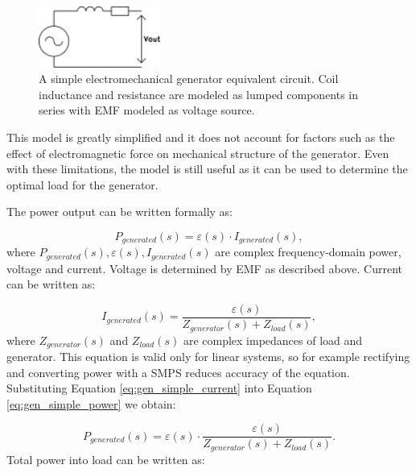 \begin{figure}[htb]
\begin{center}
\includegraphics[height=2cm]{images/own_dwg/gen_simple}
\end{center}
\caption{A simple electromechanical generator equivalent circuit. Coil inductance and resistance are modeled as lumped components in series with EMF modeled as voltage source.}
\label{gen_simple}
\end{figure}

This model is greatly simplified and it does not account for factors such as the effect of electromagnetic force on mechanical structure of the generator. Even with these limitations, the model is still useful as it can be used to determine the optimal load for the generator. 

The power output can be written formally as:

\begin{equation} \label{eq:gen_simple_power}
  P_{generated}(s) = \varepsilon(s) \cdot I_{generated}(s),
\end{equation}
where $P_{generated}(s), \varepsilon(s), I_{generated}(s)$ are complex frequency-domain power, voltage and current. Voltage is determined by EMF as described above. Current can be written as: 

\begin{equation} \label{eq:gen_simple_current}
  I_{generated}(s) = \frac{\varepsilon(s)}{Z_{generator}(s)+Z_{load}(s)},
\end{equation}
where $Z_{generator}(s) $ and $ Z_{load}(s)$ are complex impedances of load and generator. This equation is valid only for linear systems, so for example rectifying and converting power with a SMPS reduces accuracy of the equation. Substituting Equation \eqref{eq:gen_simple_current} into Equation \eqref{eq:gen_simple_power} we obtain:

\begin{equation}
  P_{generated}(s) = \varepsilon(s) \cdot \frac{\varepsilon(s)}{Z_{generator}(s)+Z_{load}(s)}.
\end{equation}
Total power into load can be written as:

